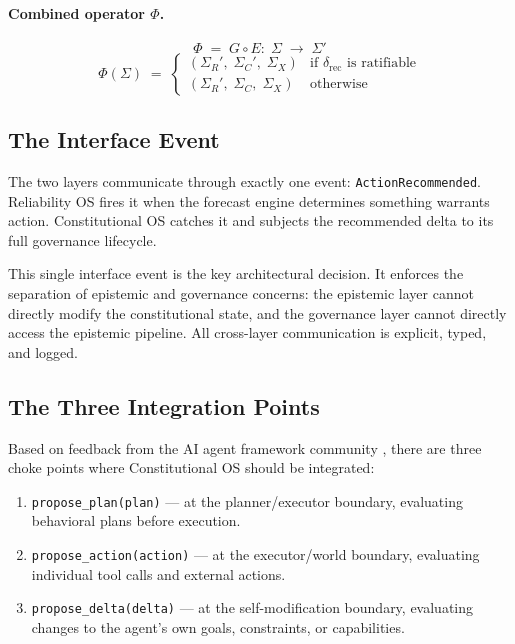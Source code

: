 \documentclass[11pt]{article}
\begin{document}
\paragraph{Combined operator $\Phi$.}
\[
  \Phi \;=\; G \circ E:\; \Sigma \;\to\; \Sigma'
\]
\[
  \Phi(\Sigma) \;=\;
  \begin{cases}
    (\Sigma_R',\; \Sigma_C',\; \Sigma_X) & \text{if } \delta_{\mathrm{rec}}
      \text{ is ratifiable} \\
    (\Sigma_R',\; \Sigma_C,\; \Sigma_X)  & \text{otherwise}
  \end{cases}
\]

\subsection{The Interface Event}

The two layers communicate through exactly one event:
\texttt{ActionRecommended}. Reliability OS fires it when the
forecast engine determines something warrants action. Constitutional
OS catches it and subjects the recommended delta to its full
governance lifecycle.

This single interface event is the key architectural decision.
It enforces the separation of epistemic and governance concerns:
the epistemic layer cannot directly modify the constitutional state,
and the governance layer cannot directly access the epistemic
pipeline. All cross-layer communication is explicit, typed, and
logged.

\subsection{The Three Integration Points}

Based on feedback from the AI agent framework community
\citep{langchain2024,autogen2024}, there are three choke points
where Constitutional OS should be integrated:

\begin{enumerate}
  \item \texttt{propose\_plan(plan)} — at the planner/executor
    boundary, evaluating behavioral plans before execution.
  \item \texttt{propose\_action(action)} — at the executor/world
    boundary, evaluating individual tool calls and external actions.
  \item \texttt{propose\_delta(delta)} — at the self-modification
    boundary, evaluating changes to the agent's own goals,
    constraints, or capabilities.
\end{enumerate}
\end{document}

